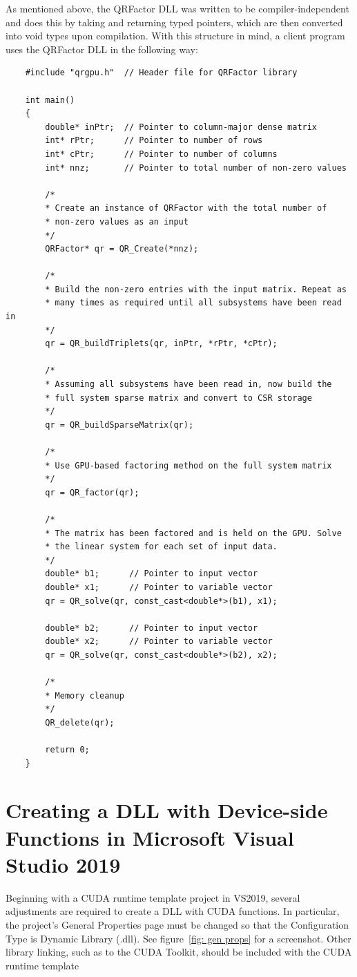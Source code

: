 \documentclass[11pt,letterpaper]{article}
\begin{document}
As mentioned above, the QRFactor DLL was written to be compiler-independent and does this by taking and returning typed pointers, which are then converted into void types upon compilation. With this structure in mind, a client program uses the QRFactor DLL in the following way:
\begin{verbatim}
    #include "qrgpu.h"  // Header file for QRFactor library

    int main()
    {
        double* inPtr;  // Pointer to column-major dense matrix  
        int* rPtr;      // Pointer to number of rows
        int* cPtr;      // Pointer to number of columns
        int* nnz;       // Pointer to total number of non-zero values

        /*
        * Create an instance of QRFactor with the total number of
        * non-zero values as an input
        */
        QRFactor* qr = QR_Create(*nnz);

        /*
        * Build the non-zero entries with the input matrix. Repeat as
        * many times as required until all subsystems have been read in
        */ 
        qr = QR_buildTriplets(qr, inPtr, *rPtr, *cPtr);
        
        /*
        * Assuming all subsystems have been read in, now build the
        * full system sparse matrix and convert to CSR storage
        */
        qr = QR_buildSparseMatrix(qr);

        /*
        * Use GPU-based factoring method on the full system matrix
        */
        qr = QR_factor(qr);
    
        /* 
        * The matrix has been factored and is held on the GPU. Solve 
        * the linear system for each set of input data.
        */
        double* b1;      // Pointer to input vector
        double* x1;      // Pointer to variable vector
        qr = QR_solve(qr, const_cast<double*>(b1), x1);

        double* b2;      // Pointer to input vector
        double* x2;      // Pointer to variable vector
        qr = QR_solve(qr, const_cast<double*>(b2), x2);

        /*
        * Memory cleanup
        */
        QR_delete(qr);

        return 0;
    }
\end{verbatim}


\section{Creating a DLL with Device-side Functions in Microsoft Visual Studio 2019}
\label{sec: gpu dll}
Beginning with a CUDA runtime template project in VS2019, several adjustments are required to create a DLL with CUDA functions. In particular, the project's General Properties page must be changed so that the Configuration Type is Dynamic Library (.dll). See figure~\ref{fig: gen props} for a screenshot. Other library linking, such as to the CUDA Toolkit, should be included with the CUDA runtime template
\end{document}
